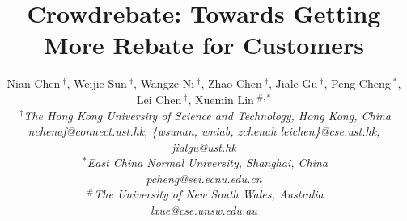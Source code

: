 \documentclass[conference]{IEEEtran}
\title{Crowdrebate: Towards Getting More Rebate for Customers}
\author{
	{Nian Chen{\small $~^{\dagger}$}, Weijie Sun{\small $~^{\dagger}$}, Wangze Ni{\small $~^{\dagger}$}, Zhao Chen{\small $~^{\dagger}$}, Jiale Gu{\small $~^{\dagger}$}, Peng Cheng{\small $~^{*}$}, Lei Chen{\small $~^{\dagger}$}, Xuemin Lin{\small $~^{\#,*}$}
	} \\
	\fontsize{10}{10}\selectfont\itshape
	$~^{\dagger}$The Hong Kong University of Science and Technology, Hong Kong, China\\
	\fontsize{9}{9}\selectfont\ttfamily\upshape
	nchenaf@connect.ust.hk, \{wsunan, wniab, zchenah leichen\}@cse.ust.hk, jialgu@ust.hk\\
	\fontsize{10}{10}\selectfont\itshape
	$~^{*}$East China Normal University, Shanghai, China\\
	\fontsize{9}{9}\selectfont\ttfamily\upshape pcheng@sei.ecnu.edu.cn \\
	\fontsize{10}{10}\selectfont\itshape
	$~^{\#}$The University of New South Wales, Australia\\
	\fontsize{9}{9}\selectfont\ttfamily\upshape
	lxue@cse.unsw.edu.au\\
}
\begin{document}
\maketitle





%



\balance




\bgroup\small

\let\xxx=\bibitem\def\bibitem{\par\vspace{0mm}\xxx} %

\egroup

\nobalance
\newpage
\end{document}
